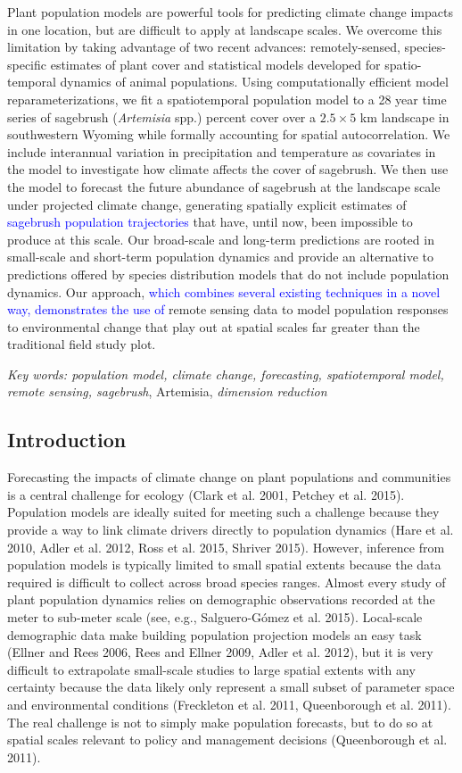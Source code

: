 \documentclass[12pt,]{article}
\begin{document}
Plant population models are powerful tools for predicting climate change
impacts in one location, but are difficult to apply at landscape scales.
We overcome this limitation by taking advantage of two recent advances:
remotely-sensed, species-specific estimates of plant cover and
statistical models developed for spatio-temporal dynamics of animal
populations. Using computationally efficient model reparameterizations,
we fit a spatiotemporal population model to a 28 year time series of
sagebrush (\emph{Artemisia} spp.) percent cover over a \(2.5\times5\) km
landscape in southwestern Wyoming while formally accounting for spatial
autocorrelation. We include interannual variation in precipitation and
temperature as covariates in the model to investigate how climate
affects the cover of sagebrush. We then use the model to forecast the
future abundance of sagebrush at the landscape scale under projected
climate change, generating spatially explicit estimates of
\textcolor{blue}{sagebrush population trajectories} that have, until
now, been impossible to produce at this scale. Our broad-scale and
long-term predictions are rooted in small-scale and short-term
population dynamics and provide an alternative to predictions offered by
species distribution models that do not include population dynamics. Our
approach,
\textcolor{blue}{which combines several existing techniques in a novel way, demonstrates the use of}
remote sensing data to model population responses to environmental
change that play out at spatial scales far greater than the traditional
field study plot.

\emph{Key words: population model, climate change, forecasting,
spatiotemporal model, remote sensing, sagebrush}, Artemisia,
\emph{dimension reduction}

\subsection{Introduction}\label{introduction}

Forecasting the impacts of climate change on plant populations and
communities is a central challenge for ecology (Clark et al. 2001,
Petchey et al. 2015). Population models are ideally suited for meeting
such a challenge because they provide a way to link climate drivers
directly to population dynamics (Hare et al. 2010, Adler et al. 2012,
Ross et al. 2015, Shriver 2015). However, inference from population
models is typically limited to small spatial extents because the data
required is difficult to collect across broad species ranges. Almost
every study of plant population dynamics relies on demographic
observations recorded at the meter to sub-meter scale (see, e.g.,
Salguero-G{ó}mez et al. 2015). Local-scale demographic data make
building population projection models an easy task (Ellner and Rees
2006, Rees and Ellner 2009, Adler et al. 2012), but it is very difficult
to extrapolate small-scale studies to large spatial extents with any
certainty because the data likely only represent a small subset of
parameter space and environmental conditions (Freckleton et al. 2011,
Queenborough et al. 2011). The real challenge is not to simply make
population forecasts, but to do so at spatial scales relevant to policy
and management decisions (Queenborough et al. 2011).
\end{document}
